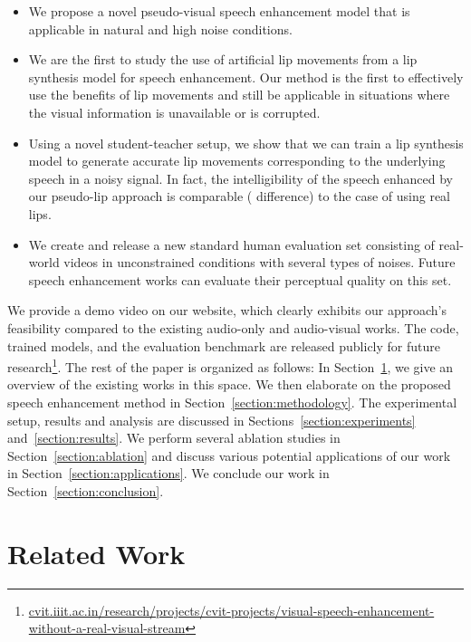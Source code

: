 \documentclass[10pt,twocolumn,letterpaper]{article}
\begin{document}
\begin{itemize}[nosep]
     \item We propose a novel pseudo-visual speech enhancement model that is applicable in natural and high noise conditions.  
     
     \item We are the first to study the use of artificial lip movements from a lip synthesis model for speech enhancement. Our method is the first to effectively use the benefits of lip movements and still be applicable in situations where the visual information is unavailable or is corrupted.
     
     \item Using a novel student-teacher setup, we show that we can train a lip synthesis model to generate accurate lip movements corresponding to the underlying speech in a noisy signal. In fact, the intelligibility of the speech enhanced by our pseudo-lip approach is comparable ( difference) to the case of using real lips.
     
     \item We create and release a new standard human evaluation set consisting of real-world videos in unconstrained conditions with several types of noises. Future speech enhancement works can evaluate their perceptual quality on this set. 
     
\end{itemize}

We provide a demo video on our website, which clearly exhibits our approach's feasibility compared to the existing audio-only and audio-visual works. The code, trained models, and the evaluation benchmark are released publicly for future research\footnote{\scriptsize\url{cvit.iiit.ac.in/research/projects/cvit-projects/visual-speech-enhancement-without-a-real-visual-stream}}. The rest of the paper is organized as follows: In Section~\ref{section:related}, we give an overview of the existing works in this space. We then elaborate on the proposed speech enhancement method in Section~\ref{section:methodology}. The experimental setup, results and analysis are discussed in Sections~\ref{section:experiments} and~\ref{section:results}. We perform several ablation studies in Section~\ref{section:ablation} and discuss various potential applications of our work in Section~\ref{section:applications}. We conclude our work in Section~\ref{section:conclusion}. 

\section{Related Work}
\label{section:related}
\end{document}
